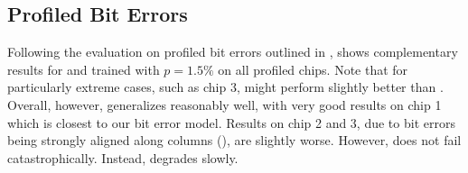 \subsection{Profiled Bit Errors}
\label{subsec:supp-randbet-baselines}

Following the evaluation on profiled bit errors outlined in ,  shows complementary results for \Clipping[$0.05$] and \Random[$0.05$] trained with $p = 1.5\%$ on all profiled chips. Note that for particularly extreme cases, such as chip 3, \Clipping might perform slightly better than \Random. Overall, however, \Random generalizes reasonably well, with very good results on chip 1 which is closest to our bit error model. Results on chip 2 and 3, due to bit errors being strongly aligned along columns (\cf {}), are slightly worse. However, \Random does not fail catastrophically. Instead, \RTE degrades slowly.

